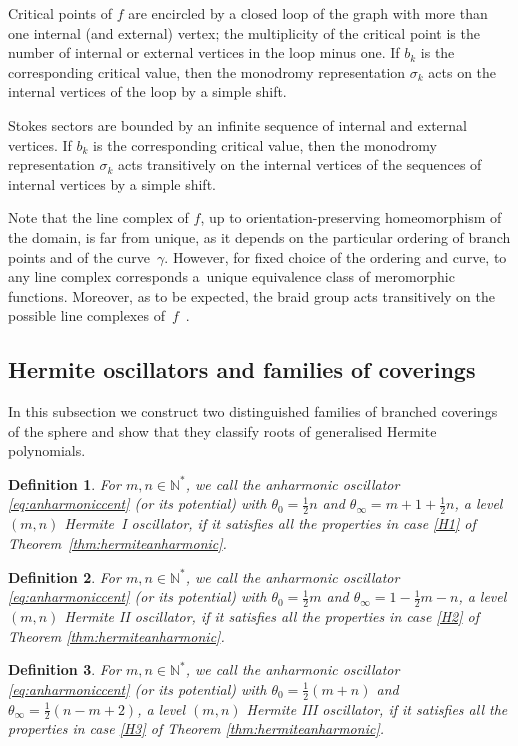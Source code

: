 \documentclass[pdftex]{sigma}
\numberwithin{equation}{section}
\newtheorem*{def*}{Definition}
\begin{document}
Critical points of $f$ are encircled by a closed loop of the graph with more than one internal (and external) vertex; the multiplicity of the critical point is the number of internal or external vertices in the loop minus one. If $b_k$ is the corresponding critical value, then the monodromy representation $\sigma_k$ acts on the internal vertices of the loop by a simple shift.

Stokes sectors are bounded by an inf\/inite sequence of internal and external vertices. If $b_k$ is the corresponding critical value, then the monodromy representation $\sigma_k$ acts transitively on the internal vertices of the sequences of internal vertices by a simple shift.

Note that the line complex of $f$, up to orientation-preserving homeomorphism of the domain, is far from unique, as it depends on the particular ordering of branch points and of the curve~$\gamma$. However, for f\/ixed choice of the ordering and curve, to any line complex corresponds a~unique equivalence class of meromorphic functions. Moreover, as to be expected, the braid group acts transitively on the possible line complexes of~$f$~\cite{elfving1934,lando2004}.

\subsection{Hermite oscillators and families of coverings}
In this subsection we construct two distinguished families of branched coverings of the sphere and show that they classify roots of generalised Hermite polynomials.

\begin{def*}
For $m,n\in\mathbb{N}^*$, we call the anharmonic oscillator \eqref{eq:anharmoniccent} (or its potential) with
$\theta_0=\tfrac{1}{2}n$ and $\theta_\infty=m+1+\tfrac{1}{2}n$, a level $(m,n)$ Hermite~I oscillator,
if it satisf\/ies all the properties in case \ref{H1} of Theorem~\ref{thm:hermiteanharmonic}.
\end{def*}

\begin{def*}
	For $m,n\in\mathbb{N}^*$, we call the anharmonic oscillator \eqref{eq:anharmoniccent} (or its potential) with
	$\theta_0=\tfrac{1}{2}m$ and $\theta_\infty=1-\tfrac{1}{2}m-n$,
	a level $(m,n)$ Hermite II oscillator, if it satisf\/ies all the properties in case \ref{H2} of Theorem \ref{thm:hermiteanharmonic}.
\end{def*}

\begin{def*}
	For $m,n\in\mathbb{N}^*$, we call the anharmonic oscillator \eqref{eq:anharmoniccent} (or its potential) with
	$\theta_0=\tfrac{1}{2}(m+n)$ and $\theta_\infty=\tfrac{1}{2}(n-m+2)$, a level $(m,n)$ Hermite III oscillator,
	if it satisf\/ies all the properties in case \ref{H3} of Theorem \ref{thm:hermiteanharmonic}.
\end{def*}
\end{document}
